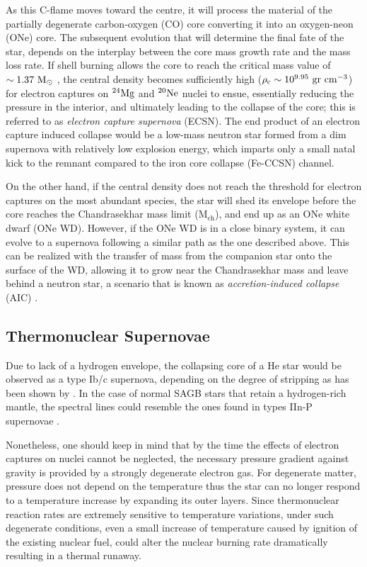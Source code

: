 \documentclass[../../main/thesis_msc.tex]{subfiles}
\begin{document}
As this C-flame moves toward the centre, it will process the material of the partially degenerate carbon-oxygen (CO) core converting it into an oxygen-neon (ONe) core. The subsequent evolution that will determine the final fate of the star, depends on the interplay between the core mass growth rate and the mass loss rate. If shell burning allows the core to reach the critical mass value of $\rm \sim 1.37 \ M_{\odot}$ \citep{Nomoto1984}, the central density becomes sufficiently high ($\rm \rho_c \sim 10^{9.95} \ gr \ cm^{-3}$) for electron captures on $\rm ^{24}Mg$ and $\rm ^{20}Ne$ nuclei to ensue, essentially reducing the pressure in the interior, and ultimately leading to the collapse of the core; this is referred to as \textit{electron capture supernova} (ECSN).
The end product of an electron capture induced collapse would be a low-mass neutron star formed from a dim supernova \citep[e.g.][and references therein]{Fischer2010} with relatively low explosion energy, which imparts only a small natal kick to the remnant \citep{Knigge2011, Jones_2013, Jones2016} compared to the iron core collapse (Fe-CCSN) channel.

On the other hand, if the central density does not reach the threshold for electron captures on the most abundant species, the star will shed its envelope before the core reaches the Chandrasekhar mass limit (M$_{\text{ch}}$), and end up as an ONe white dwarf (ONe WD). However, if the ONe WD is in a close binary system, it can evolve to a supernova following a similar path as the one described above. This can be realized with the transfer of mass from the companion star onto the surface of the WD, allowing it to grow near the Chandrasekhar mass and leave behind a neutron star, a scenario that is known as \textit{accretion-induced collapse} (AIC) \citep[e.g.][]{nomoto1991, Schwab:2015bma, Brooks2017a, Schwab:2018cnb}.

\subsection{Thermonuclear Supernovae} \label{sec:thermonuclearSNe}
Due to lack of a hydrogen envelope, the collapsing core of a He star would be observed as a type Ib/c supernova, depending on the degree of stripping as has been shown by \cite{Tauris2013, Tauris2015}. In the case of normal SAGB stars that retain a hydrogen-rich mantle, the spectral lines could resemble the ones found in types IIn-P supernovae \citep[see][for details]{Moriya2014}.

Nonetheless, one should keep in mind that by the time the effects of electron captures on nuclei cannot be neglected, the necessary pressure gradient against gravity is provided by a strongly degenerate electron gas. For degenerate matter, pressure does not depend on the temperature thus the star can no longer respond to a temperature increase by expanding its outer layers. Since thermonuclear reaction rates are extremely sensitive to temperature variations, under such degenerate conditions, even a small increase of temperature caused by ignition of the existing nuclear fuel, could alter the nuclear burning rate dramatically resulting in a thermal runaway.
\end{document}
